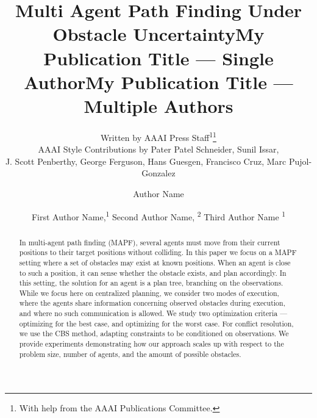 \documentclass[letterpaper]{article} %
\title{Multi Agent Path Finding Under Obstacle Uncertainty}
\author{
    Written by AAAI Press Staff\textsuperscript{\rm 1}\thanks{With help from the AAAI Publications Committee.}\\
    AAAI Style Contributions by Pater Patel Schneider,
    Sunil Issar,\\
    J. Scott Penberthy,
    George Ferguson,
    Hans Guesgen,
    Francisco Cruz\equalcontrib,
    Marc Pujol-Gonzalez\equalcontrib
}
\title{My Publication Title --- Single Author}
\author {
    Author Name
}
\title{My Publication Title --- Multiple Authors}
\author {
    First Author Name,\textsuperscript{\rm 1}
    Second Author Name, \textsuperscript{\rm 2}
    Third Author Name \textsuperscript{\rm 1}
}
\begin{document}
\maketitle
\begin{abstract}
In multi-agent path finding (MAPF), several agents must move from their current positions to their target positions without colliding. In this paper we focus on a MAPF setting where a set of obstacles may exist at known positions. When an agent is close to such a position, it can sense whether the obstacle exists, and plan accordingly. In this setting, the solution for an agent is a plan tree, branching on the observations.
While we focus here on centralized planning, we consider two modes of execution, where the agents share information concerning observed obstacles during execution, and where no such communication is allowed.
We study two optimization criteria --- optimizing for the best case, and optimizing for the worst case.
For conflict resolution, we use the CBS method, adapting constraints to be conditioned on observations.
We provide experiments demonstrating how our approach scales up with respect to the problem size, number of agents, and the amount of possible obstacles.
\end{abstract}
\end{document}
